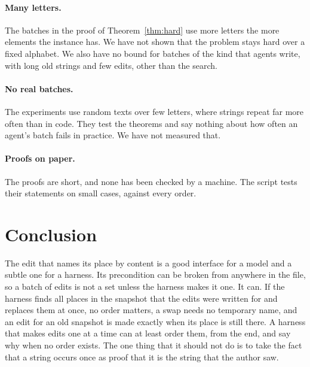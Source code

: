 \documentclass[acmsmall,nonacm,screen]{acmart}
\begin{document}
\paragraph{Many letters.} The batches in the proof of Theorem~\ref{thm:hard} use more letters
the more elements the instance has. We have not shown that the problem stays hard over a
fixed alphabet. We also have no bound for batches of the kind that agents write, with long
old strings and few edits, other than the search.

\paragraph{No real batches.} The experiments use random texts over few letters, where
strings repeat far more often than in code. They test the theorems and say nothing about
how often an agent's batch fails in practice. We have not measured that.

\paragraph{Proofs on paper.} The proofs are short, and none has been checked by a machine.
The script tests their statements on small cases, against every order.

\section{Conclusion}

The edit that names its place by content is a good interface for a model and a subtle one for
a harness. Its precondition can be broken from anywhere in the file, so a batch of edits is
not a set unless the harness makes it one. It can. If the harness finds all places in the
snapshot that the edits were written for and replaces them at once, no order matters, a swap
needs no temporary name, and an edit for an old snapshot is made exactly when its place is
still there. A harness that makes edits one at a time can at least order them, from the end,
and say why when no order exists. The one thing that it should not do is to take the fact
that a string occurs once as proof that it is the string that the author saw.



\end{document}
